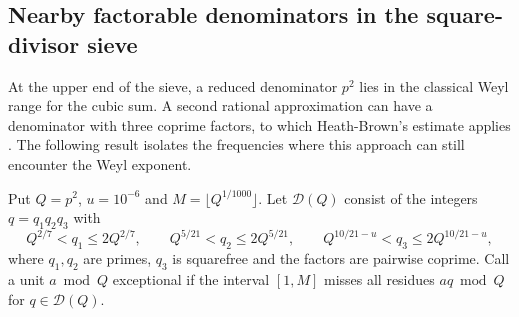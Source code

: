 \documentclass[11pt,letterpaper]{article}
\theoremstyle{definition}
\begin{document}
\subsection{Nearby factorable denominators in the square-divisor sieve}
\label{c3:nearby-denominators}
At the upper end of the sieve, a reduced denominator $p^2$ lies in
the classical Weyl range for the cubic sum. A second rational
approximation can have a denominator with three coprime factors,
to which Heath-Brown's estimate applies \cite[Theorem~2]{c3:hb-factor}.
The following result isolates the frequencies where this approach
can still encounter the Weyl exponent.

Put $Q=p^2$, $u=10^{-6}$ and $M=\lfloor Q^{1/1000}\rfloor$.
Let $\mathcal D(Q)$ consist of the integers $q=q_1q_2q_3$ with
\[
 Q^{2/7}<q_1\le2Q^{2/7},\qquad Q^{5/21}<q_2\le2Q^{5/21},\qquad
 Q^{10/21-u}<q_3\le2Q^{10/21-u},
\]
where $q_1,q_2$ are primes, $q_3$ is squarefree and the factors are
pairwise coprime. Call a unit $a\bmod Q$ exceptional if the interval
$[1,M]$ misses all residues $aq\bmod Q$ for $q\in\mathcal D(Q)$.
\end{document}
